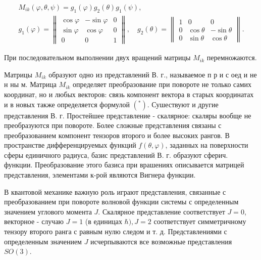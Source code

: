 \documentclass[10pt]{article}
\begin{document}
\[

\begin{gathered}

M_{i k}(\varphi, \theta, \psi)=g_{1}(\varphi) g_{2}(\theta) g_{1}(\psi), \\

g_{1}(\varphi)=\left\|\begin{array}{ccc}

\cos \varphi & -\sin \varphi & 0 \\

\sin \varphi & \cos \varphi & 0 \\

0 & 0 & 1

\end{array}\right\|, \quad g_{2}(\theta)=\left\|\begin{array}{ccc}

1 & 0 & 0 \\

0 & \cos \theta & -\sin \theta \\

0 & \sin \theta & \cos \theta

\end{array}\right\| .

\end{gathered}

\]



При последовательном выполнении двух вращений матрицы $M_{i k}$ перемножаются.



Матрицы $M_{i k}$ образуют одно из представлений В. г., называемое п р и с оед и не н ны м. Матрица $M_{i k}$ определяет преобразование при повороте не только самих координат, но и любых векторов: связь компонент вектора в старых координатах и в новых также определяется формулой $\left({ }^{*}\right)$. Сушествуют и другие представления В. г. Простейшее представление - скалярное: скаляры вообще не преобразуются при повороте. Более сложные представления связаны с преобразованием компонент тензоров второго и более высоких рангов. В пространстве дифференцируемых функций $f(\theta, \varphi)$, заданных на поверхности сферы единичного радиуса, базис представлений В. г. образуют сферич. функции. Преобразование этого базиса при врашениях описывается матрицей представления, элементами к-рой являются Вигнера функции.



В квантовой механике важную роль играют представления, связанные с преобразованием при повороте волновой функции системы с определенным значением углового момента $J$. Скалярное представление соответствует $J=0$, векторное - случаю $J=1$ (в единицах $\hbar), J=2$ соответствует симметричному тензору второго ранга с равным нулю следом и т. д. Представлениями с определенным значением $J$ исчерпываются все возможные представления $S O(3)$.
\end{document}
